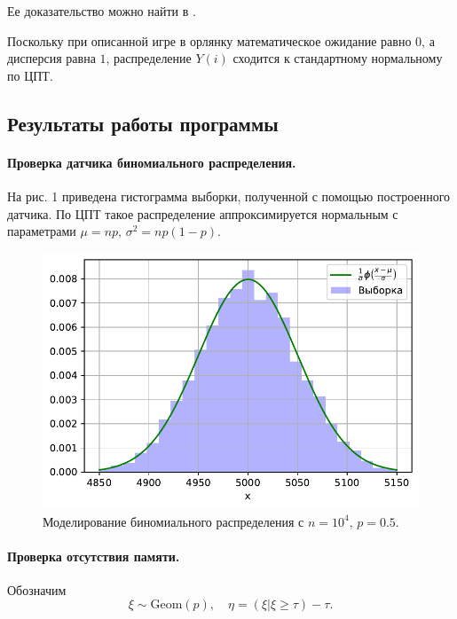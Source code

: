 \documentclass[16pt]{article}
\begin{document}
Ее доказательство можно найти в \cite{Shir}.

Поскольку при описанной игре в орлянку математическое ожидание равно $0$, а дисперсия равна $1$, распределение $Y(i)$ сходится к стандартному нормальному по ЦПТ. 

\subsection{Результаты работы программы}

\paragraph{Проверка датчика биномиального распределения.} На рис. 1 приведена гистограмма выборки, полученной с помощью построенного датчика. По ЦПТ такое распределение аппроксимируется нормальным с параметрами $\mu = np,\, \sigma^2 = np(1-p)$.
\begin{figure}[h]
	\center
    \includegraphics[scale=0.7]{1_1.pdf}
    \caption{Моделирование биномиального распределения с $n = 10^4,\, p = 0.5$.}
\end{figure}

\paragraph{Проверка отсутствия памяти.} Обозначим $$\xi \sim \mathrm{Geom}(p), \quad \eta = (\xi | \xi \geq \tau) - \tau.$$ 
\end{document}
